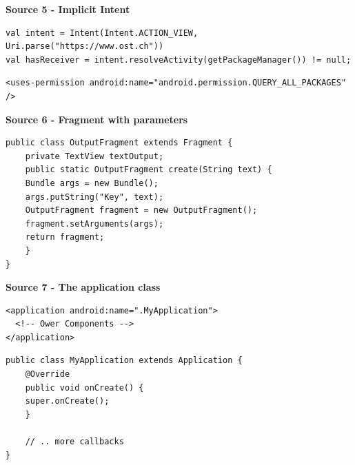 \documentclass[11pt,twoside,landscape]{article}
\begin{document}
\textbf{Source 5 - Implicit Intent}

\lstset{language=java,label= ,caption= ,captionpos=b,numbers=none}
\begin{lstlisting}
val intent = Intent(Intent.ACTION_VIEW, Uri.parse("https://www.ost.ch"))
val hasReceiver = intent.resolveActivity(getPackageManager()) != null;
\end{lstlisting}

\lstset{language=XML,label= ,caption= ,captionpos=b,numbers=none}
\begin{lstlisting}
<uses-permission android:name="android.permission.QUERY_ALL_PACKAGES" />
\end{lstlisting}

\textbf{Source 6 - Fragment with parameters}

\lstset{language=java,label= ,caption= ,captionpos=b,numbers=none}
\begin{lstlisting}
public class OutputFragment extends Fragment {
    private TextView textOutput;
    public static OutputFragment create(String text) {
	Bundle args = new Bundle();
	args.putString("Key", text);
	OutputFragment fragment = new OutputFragment();
	fragment.setArguments(args);
	return fragment;
    }
}
\end{lstlisting}

\textbf{Source 7 - The application class}

\lstset{language=XML,label= ,caption= ,captionpos=b,numbers=none}
\begin{lstlisting}
<application android:name=".MyApplication">
  <!-- Ower Components -->
</application>
\end{lstlisting}

\lstset{language=java,label= ,caption= ,captionpos=b,numbers=none}
\begin{lstlisting}
public class MyApplication extends Application {
    @Override
    public void onCreate() {
	super.onCreate();
    }

    // .. more callbacks
}
\end{lstlisting}
\end{document}
